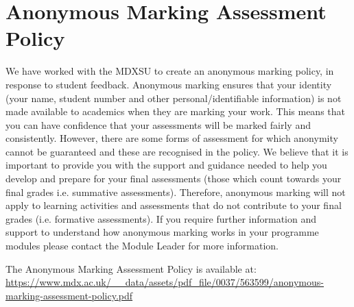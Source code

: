 \documentclass{MDXHandbook}
\begin{document}
\section*{Anonymous Marking Assessment Policy}
We have worked with the MDXSU to create an anonymous marking policy, in response to student feedback.  Anonymous marking ensures that your identity (your name, student number and other personal/identifiable information) is not made available to academics when they are marking your work.  This means that you can have confidence that your assessments will be marked fairly and consistently.  However, there are some forms of assessment for which anonymity cannot be guaranteed and these are recognised in the policy.  We believe that it is important to provide you with the support and guidance needed to help you develop and prepare for your final assessments (those which count towards your final grades i.e. summative assessments).  Therefore, anonymous marking will not apply to learning activities and assessments that do not contribute to your final grades (i.e. formative assessments).  If you require further information and support to understand how anonymous marking works in your programme modules please contact the Module Leader for more information.

The Anonymous Marking Assessment Policy is available at: 
\url{https://www.mdx.ac.uk/__data/assets/pdf_file/0037/563599/anonymous-marking-assessment-policy.pdf}
\end{document}
